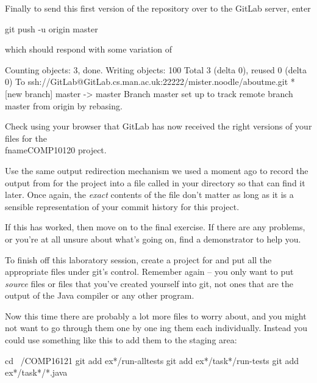 Finally to send this first version of the repository over to the GitLab server, enter

\begin{ttoutenv}
git push -u origin master
\end{ttoutenv}

which should respond with some variation of 

\begin{ttoutenv}
Counting objects: 3, done.
Writing objects: 100%
Total 3 (delta 0), reused 0 (delta 0)
To ssh://GitLab@GitLab.cs.man.ac.uk:22222/mister.noodle/aboutme.git
 * [new branch]      master -> master
Branch master set up to track remote branch master from origin by rebasing.
\end{ttoutenv}
 
Check using your browser that GitLab has now received the right versions of your files for the \\fname{COMP10120} project.

Use the same output redirection mechanism we used a moment ago to record the output from  for the  project into a file called  in your  directory so that  can find it later. Once again, the \emph{exact} contents of the file don't matter as long as it is a sensible representation of your commit history for this project.

If this has worked, then move on to the final exercise. If there are any problems, or you're at all unsure about what's going on, find a demonstrator to help you. 


To finish off this laboratory session, create a project for  and put all the appropriate files under git's control. Remember again -- you only want to put \emph{source} files or files that you've created yourself into git, not ones that are the output of the Java compiler or any other program.

Now this time there are probably a lot more files to worry about, and you might not want to go through them one by one ing them each individually. Instead you could use something like this to add them to the staging area:

\begin{ttoutenv}
cd ~/COMP16121
git add ex*/run-alltests
git add ex*/task*/run-tests
git add ex*/task*/*.java
\end{ttoutenv}

